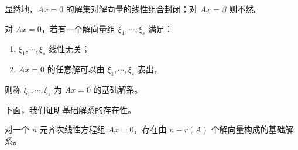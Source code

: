 显然地，$Ax=0$ 的解集对解向量的线性组合封闭；对 $Ax=\beta$ 则不然。

\begin{definition}
	对 $Ax=0$，若有一个解向量组 $\xi_1,\cdots,\xi_s$ 满足：
	\begin{enumerate}
		\item $\xi_1,\cdots,\xi_s$ 线性无关；
		\item $Ax=0$ 的任意解可以由 $\xi_1,\cdots,\xi_s$ 表出，
	\end{enumerate}
	则称 $\xi_1,\cdots,\xi_s$ 为 $Ax=0$ 的基础解系。
\end{definition}

下面，我们证明基础解系的存在性。

\begin{theorem}
	对一个 $n$ 元齐次线性方程组 $Ax=0$，存在由 $n-r(A)$ 个解向量构成的基础解系。
\end{theorem}
